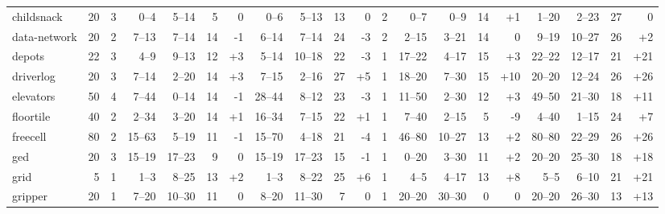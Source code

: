 \documentclass{article}
\begin{document}
\begin{table}
\begin{tabular}{l@{}rr|rrrr|rrrr|r|rrrr|rrrr}
    childsnack &     20 &   3 &     0--4 &   5--14 &   5 &                 0 &     0--6 &   5--13 &  13 &                  0 &   2 &      0--7 &    0--9 &  14 &   {\color{blue}+1} &     1--20 &   2--23 &  27 &                  0 \\
  data-network &     20 &   2 &    7--13 &   7--14 &  14 &   {\color{red}-1} &    6--14 &   7--14 &  24 &    {\color{red}-3} &   2 &     2--15 &   3--21 &  14 &                  0 &     9--19 &  10--27 &  26 &   {\color{blue}+2} \\
        depots &     22 &   3 &     4--9 &   9--13 &  12 &  {\color{blue}+3} &    5--14 &  10--18 &  22 &    {\color{red}-3} &   1 &    17--22 &   4--17 &  15 &   {\color{blue}+3} &    22--22 &  12--17 &  21 &  {\color{blue}+21} \\
     driverlog &     20 &   3 &    7--14 &   2--20 &  14 &  {\color{blue}+3} &    7--15 &   2--16 &  27 &   {\color{blue}+5} &   1 &    18--20 &   7--30 &  15 &  {\color{blue}+10} &    20--20 &  12--24 &  26 &  {\color{blue}+26} \\
     elevators &     50 &   4 &    7--44 &   0--14 &  14 &   {\color{red}-1} &   28--44 &   8--12 &  23 &    {\color{red}-3} &   1 &    11--50 &   2--30 &  12 &   {\color{blue}+3} &    49--50 &  21--30 &  18 &  {\color{blue}+11} \\
     floortile &     40 &   2 &    2--34 &   3--20 &  14 &  {\color{blue}+1} &   16--34 &   7--15 &  22 &   {\color{blue}+1} &   1 &     7--40 &   2--15 &   5 &    {\color{red}-9} &     4--40 &   1--15 &  24 &   {\color{blue}+7} \\
      freecell &     80 &   2 &   15--63 &   5--19 &  11 &   {\color{red}-1} &   15--70 &   4--18 &  21 &    {\color{red}-4} &   1 &    46--80 &  10--27 &  13 &   {\color{blue}+2} &    80--80 &  22--29 &  26 &  {\color{blue}+26} \\
           ged &     20 &   3 &   15--19 &  17--23 &   9 &                 0 &   15--19 &  17--23 &  15 &    {\color{red}-1} &   1 &     0--20 &   3--30 &  11 &   {\color{blue}+2} &    20--20 &  25--30 &  18 &  {\color{blue}+18} \\
          grid &      5 &   1 &     1--3 &   8--25 &  13 &  {\color{blue}+2} &     1--3 &   8--22 &  25 &   {\color{blue}+6} &   1 &      4--5 &   4--17 &  13 &   {\color{blue}+8} &      5--5 &   6--10 &  21 &  {\color{blue}+21} \\
       gripper &     20 &   1 &    7--20 &  10--30 &  11 &                 0 &    8--20 &  11--30 &   7 &                  0 &   1 &    20--20 &  30--30 &   0 &                  0 &    20--20 &  26--30 &  13 &  {\color{blue}+13} \\

\end{tabular}
\end{table}
\end{document}
